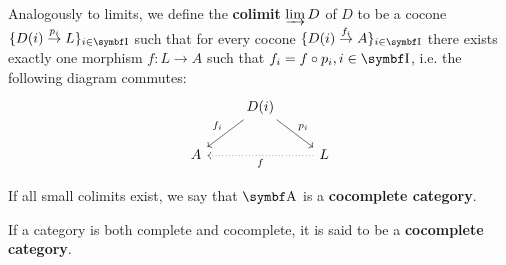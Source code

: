 \begin{definition}\label{def:categorical_colimit}\cite[definition 5.1.19(b)]{Leinster2014}
  Analogously to limits, we define the \textbf{colimit} \( \varinjlim D \) of \( D \) to be a cocone \( \{ D(i) \overset {p_i} \to L \}_{i \in \Bold I} \) such that for every cocone \( \{ D(i) \overset {f_i} \to A \}_{i \in \Bold I} \) there exists exactly one morphism \( f: L \to A \) such that \( f_i = f \circ p_i, i \in \Bold I \), i.e. the following diagram commutes:
  \begin{equation*}
    \begin{tikzcd}
        & D(i) \arrow[rd, "p_i"] \arrow[ld, "f_i"'] & \\
      A &                                           & L \arrow[ll, "f", dotted]
    \end{tikzcd}
  \end{equation*}

  If all small colimits exist, we say that \( \Bold A \) is a \textbf{cocomplete category}.
\end{definition}

\begin{definition}\label{def:cocomplete_category}
  If a category is both complete and cocomplete, it is said to be a \textbf{cocomplete category}.
\end{definition}

